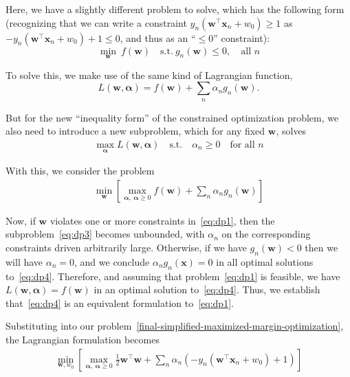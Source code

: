 Here, we have a slightly different problem to solve, which  has the following form (recognizing that we can write a constraint $ y_{n}(\textbf{w}^\top\textbf{x}_{n} + w_{0}) \geq 1$ as $-y_{n}(\textbf{w}^\top\textbf{x}_{n} + w_{0}) + 1\leq 0$, and thus as an ``$\leq 0$'' constraint):
%
\begin{equation}
  \label{eq:dp1}
  \min_{\mathbf{w}}\ f({\mathbf w}) \quad \mbox{s.t.}\ g_n({\mathbf w})\leq 0, \quad \mbox{all $n$}
\end{equation}

To solve this,  we make use of the same kind of Lagrangian function,
%
\begin{equation}
  \label{eq:dp2}
  L({\mathbf w},\boldsymbol{\alpha})=f({\mathbf w})+\sum_n \alpha_n g_n({\mathbf w}).
\end{equation}

But for the new ``inequality form'' of the constrained optimization problem,
we also need to introduce a new subproblem, which for any fixed ${\mathbf w}$, solves
%
\begin{align}
  \label{eq:dp3}
  \max_{\boldsymbol{\alpha}} L({\mathbf w},\boldsymbol{\alpha}) \quad   \mbox{s.t.} \quad  \alpha_n \geq 0\quad\mbox{for all $n$}
\end{align}

With this, we consider the problem
%
%
\begin{align}
\label{eq:dp4}
 \min_{\mathbf w} \left[\max_{\boldsymbol{\alpha}, \ \boldsymbol{\alpha}\geq 0} f({\mathbf w})+\sum_n \alpha_n g_n({\mathbf w})\right]
\end{align}

Now, if ${\mathbf w}$ violates one or more constraints in~\eqref{eq:dp1}, then the subproblem~\eqref{eq:dp3} becomes unbounded, with $\alpha_n$ on the corresponding constraints driven arbitrarily large. Otherwise, if we have $g_n({\mathbf w})<0$ then we will have $\alpha_n=0$, and
we conclude $\alpha_n g_n({\mathbf x})=0$ in all optimal solutions to~\eqref{eq:dp4}.
Therefore, and assuming that problem~\eqref{eq:dp1} is feasible, we have $L({\mathbf w},\boldsymbol{\alpha})=f({\mathbf w})$ in an optimal solution to~\eqref{eq:dp4}.
%
Thus, we establish that~\eqref{eq:dp4}  is an equivalent formulation  to~\eqref{eq:dp1}.

\medskip

Substituting into our problem~\eqref{final-simplified-maximized-margin-optimization}, the Lagrangian formulation becomes
%
\begin{align}
  \min_{\mathbf{w},w_0}\left[\max_{\boldsymbol{\alpha},\ \boldsymbol{\alpha}\geq 0} \frac{1}{2} {\mathbf w}^\top{\mathbf w} +\sum_n \alpha_n(-y_{n}(\textbf{w}^\top\textbf{x}_{n} + w_{0}) + 1)\right]
\end{align}

